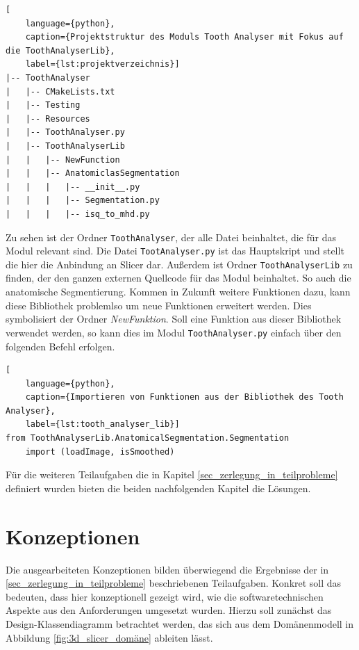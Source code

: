 \begin{lstlisting}[
    language={python},
    caption={Projektstruktur des Moduls Tooth Analyser mit Fokus auf die ToothAnalyserLib},
    label={lst:projektverzeichnis}]
|-- ToothAnalyser
|   |-- CMakeLists.txt
|   |-- Testing
|   |-- Resources
|   |-- ToothAnalyser.py
|   |-- ToothAnalyserLib
|   |   |-- NewFunction
|   |   |-- AnatomiclasSegmentation
|   |   |   |-- __init__.py
|   |   |   |-- Segmentation.py
|   |   |   |-- isq_to_mhd.py
\end{lstlisting}

Zu sehen ist der Ordner \texttt{ToothAnalyser}, der alle Datei beinhaltet, die
für das Modul relevant sind. Die Datei \texttt{TootAnalyser.py} ist das
Hauptskript und stellt die hier die Anbindung an Slicer dar. Außerdem ist Ordner
\texttt{ToothAnalyserLib} zu finden, der den ganzen externen Quellcode für das Modul
beinhaltet. So auch die anatomische Segmentierung. Kommen in Zukunft weitere Funktionen
dazu, kann diese Bibliothek problemlso um neue Funktionen erweitert werden. Dies
symbolisiert der Ordner \textsl{NewFunktion}. Soll eine Funktion aus dieser Bibliothek
verwendet werden, so kann dies im Modul \texttt{ToothAnalyser.py} einfach über den
folgenden Befehl erfolgen.

\begin{lstlisting}[
    language={python},
    caption={Importieren von Funktionen aus der Bibliothek des Tooth Analyser},
    label={lst:tooth_analyser_lib}]
from ToothAnalyserLib.AnatomicalSegmentation.Segmentation
	import (loadImage, isSmoothed)
\end{lstlisting}

Für die weiteren Teilaufgaben die in Kapitel \ref{sec_zerlegung_in_teilprobleme}
definiert wurden bieten die beiden nachfolgenden Kapitel die Lösungen.

\section{Konzeptionen}
\label{sec:konzeptionen} Die ausgearbeiteten Konzeptionen bilden überwiegend die
Ergebnisse der in \ref{sec_zerlegung_in_teilprobleme} beschriebenen Teilaufgaben.
Konkret soll das bedeuten, dass hier konzeptionell gezeigt wird, wie die softwaretechnischen
Aspekte aus den Anforderungen umgesetzt wurden. Hierzu soll zunächst das Design-Klassendiagramm
betrachtet werden, das sich aus dem Domänenmodell in Abbildung \ref{fig:3d_slicer_domäne}
ableiten lässt.

